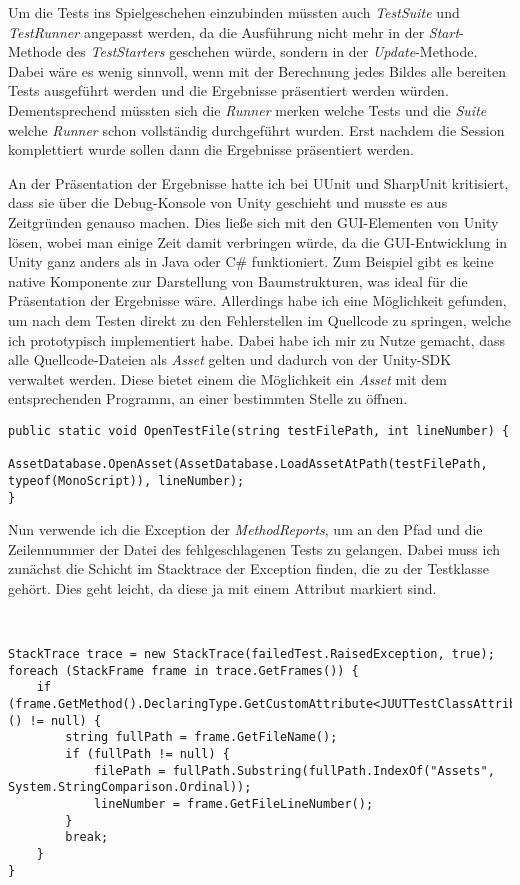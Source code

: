 Um die Tests ins Spielgeschehen einzubinden müssten auch \textit{TestSuite} und \textit{TestRunner} angepasst werden, da die Ausführung nicht mehr in der \textit{Start}-Methode des \textit{TestStarters} geschehen würde, sondern in der \textit{Update}-Methode. Dabei wäre es wenig sinnvoll, wenn mit der Berechnung jedes Bildes alle bereiten Tests ausgeführt werden und die Ergebnisse präsentiert werden würden. Dementsprechend müssten sich die \textit{Runner} merken welche Tests und die \textit{Suite} welche \textit{Runner} schon vollständig durchgeführt wurden. Erst nachdem die Session komplettiert wurde sollen dann die Ergebnisse präsentiert werden.

An der Präsentation der Ergebnisse hatte ich bei UUnit und SharpUnit kritisiert, dass sie über die Debug-Konsole von Unity geschieht und musste es aus Zeitgründen genauso machen. Dies ließe sich mit den GUI-Elementen von Unity lösen, wobei man einige Zeit damit verbringen würde, da die GUI-Entwicklung in Unity ganz anders als in Java oder C\# funktioniert. Zum Beispiel gibt es keine native Komponente zur Darstellung von Baumstrukturen, was ideal für die Präsentation der Ergebnisse wäre. Allerdings habe ich eine Möglichkeit gefunden, um nach dem Testen direkt zu den Fehlerstellen im Quellcode zu springen, welche ich prototypisch implementiert habe. Dabei habe ich mir zu Nutze gemacht, dass alle Quellcode-Dateien als \textit{Asset} gelten und dadurch von der Unity-SDK verwaltet werden. Diese bietet einem die Möglichkeit ein \textit{Asset} mit dem entsprechenden Programm, an einer bestimmten Stelle zu öffnen.
\begin{lstlisting}[caption={[Code zum Öffnen einer Quelldatei]Code zum Öffnen einer Quelldatei}, label=code:JUUTUnityUtil_OpenTestFile]
public static void OpenTestFile(string testFilePath, int lineNumber) {
    AssetDatabase.OpenAsset(AssetDatabase.LoadAssetAtPath(testFilePath, typeof(MonoScript)), lineNumber);
}
\end{lstlisting}

Nun verwende ich die Exception der \textit{MethodReports}, um an den Pfad und die Zeilennummer der Datei des fehlgeschlagenen Tests zu gelangen. Dabei muss ich zunächst die Schicht im Stacktrace der Exception finden, die zu der Testklasse gehört. Dies geht leicht, da diese ja mit einem Attribut markiert sind.

~

\begin{lstlisting}[caption={[Algorithmus zum finden der Fehlgeschlagenen Testklasse]Algorithmus zum finden der Fehlgeschlagenen Testklasse}, label=code:FindFailedTestFile]
StackTrace trace = new StackTrace(failedTest.RaisedException, true);
foreach (StackFrame frame in trace.GetFrames()) {
    if (frame.GetMethod().DeclaringType.GetCustomAttribute<JUUTTestClassAttribute>() != null) {
        string fullPath = frame.GetFileName();
        if (fullPath != null) {
            filePath = fullPath.Substring(fullPath.IndexOf("Assets", System.StringComparison.Ordinal));
            lineNumber = frame.GetFileLineNumber();
        }
        break;
    }
}
\end{lstlisting}

